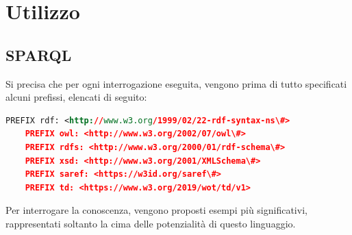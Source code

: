 \documentclass[12pt,a4paper,openright,oneside]{report}
\begin{document}
\section{Utilizzo}

\subsection{SPARQL}
Si precisa che per ogni interrogazione eseguita, vengono prima di tutto specificati alcuni prefissi, elencati di seguito:

\begin{lstlisting}[language=XML]
	PREFIX rdf: <http://www.w3.org/1999/02/22-rdf-syntax-ns\#>
	PREFIX owl: <http://www.w3.org/2002/07/owl\#>
	PREFIX rdfs: <http://www.w3.org/2000/01/rdf-schema\#>
	PREFIX xsd: <http://www.w3.org/2001/XMLSchema\#>
	PREFIX saref: <https://w3id.org/saref\#>
	PREFIX td: <https://www.w3.org/2019/wot/td/v1>
\end{lstlisting}

Per interrogare la conoscenza, vengono proposti esempi più significativi, rappresentati soltanto la cima delle potenzialità di questo linguaggio. 
\end{document}
